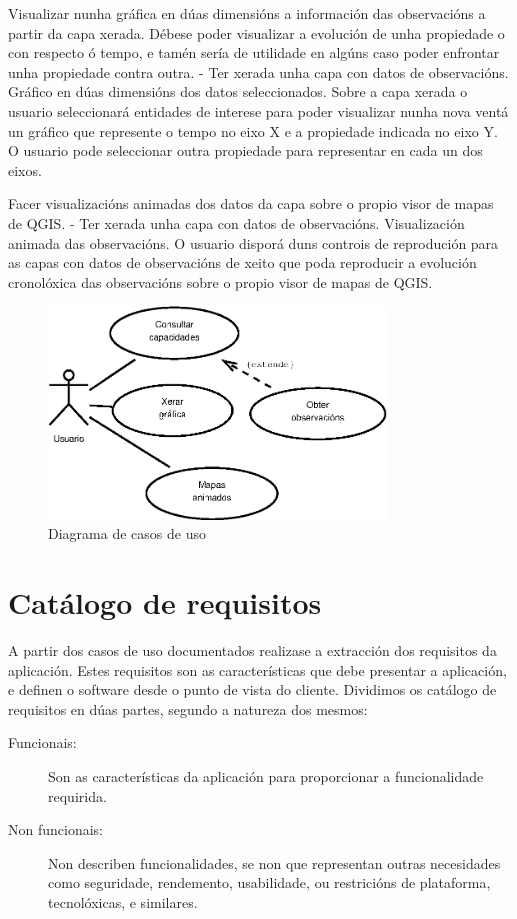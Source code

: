 			{Visualizar nunha gráfica en dúas dimensións a información das observacións a partir da capa xerada. Débese poder visualizar a evolución de unha propiedade o con respecto ó tempo, e tamén sería de utilidade en algúns caso poder enfrontar unha propiedade contra outra. } %
			{-} %
			{Ter xerada unha capa con datos de observacións.} %
			{Gráfico en dúas dimensións dos datos seleccionados.} %
			{Sobre a capa xerada o usuario seleccionará entidades de interese para poder visualizar nunha nova ventá un gráfico que represente o tempo no eixo X e a propiedade indicada no eixo Y. O usuario pode seleccionar outra propiedade para representar en cada un dos eixos.
			} %
			
			{Facer visualizacións animadas dos datos da capa sobre o propio visor de mapas de QGIS.} %
			{-} %
			{Ter xerada unha capa con datos de observacións.} %
			{Visualización animada das observacións.} %
			{O usuario disporá duns controis de reprodución para as capas con datos de observacións de xeito que poda reproducir a evolución cronolóxica das observacións sobre o propio visor de mapas de QGIS. 
			} %

\begin{figure}[hbtp]
\centering
\includegraphics[width=0.8\textwidth]{images/uc.eps}
\caption{Diagrama de casos de uso}
\label{fig:uc} 
\end{figure}

\section{Catálogo de requisitos}
A partir dos casos de uso documentados realizase a extracción dos requisitos da aplicación. Estes requisitos son as características que debe presentar a aplicación, e definen o software desde o punto de vista do cliente. Dividimos os catálogo de requisitos en dúas partes, segundo a natureza dos mesmos:
\begin{description}
\item[Funcionais:] Son as características da aplicación para proporcionar a funcionalidade requirida.
\item[Non funcionais:] Non describen funcionalidades, se non que representan outras necesidades como seguridade, rendemento, usabilidade, ou restricións de plataforma, tecnolóxicas, e similares.
\end{description}

